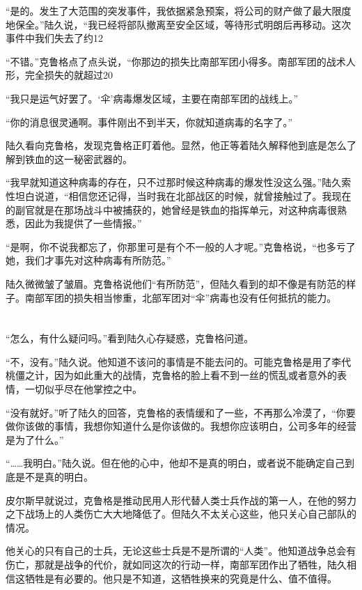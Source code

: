 “是的。发生了大范围的突发事件，我依据紧急预案，将公司的财产做了最大限度地保全。”陆久说，“我已经将部队撤离至安全区域，等待形式明朗后再移动。这次事件中我们失去了约12%

“不错。”克鲁格点了点头说，“你那边的损失比南部军团小得多。南部军团的战术人形，完全损失的就超过20%

“我只是运气好罢了。‘伞’病毒爆发区域，主要在南部军团的战线上。”

“你的消息很灵通啊。事件刚出不到半天，你就知道病毒的名字了。”

陆久看向克鲁格，发现克鲁格正盯着他。显然，他正等着陆久解释他到底是怎么了解到铁血的这一秘密武器的。

“我早就知道这种病毒的存在，只不过那时候这种病毒的爆发性没这么强。”陆久索性坦白说道，“相信您还记得，当时我在北部战区的时候，就曾接触过了。我现在的副官就是在那场战斗中被捕获的，她曾经是铁血的指挥单元，对这种病毒很熟悉，因此为我提供了一些情报。”

“是啊，你不说我都忘了，你那里可是有个不一般的人才呢。”克鲁格说，“也多亏了她，我们才事先对这种病毒有所防范。”

陆久微微皱了皱眉。克鲁格说他们“有所防范”，但陆久看到的却不像是有防范的样子。南部军团的损失相当惨重，北部军团对“伞”病毒也没有任何抵抗的能力。

\section*{}

“怎么，有什么疑问吗。”看到陆久心存疑惑，克鲁格问道。

“不，没有。”陆久说。他知道不该问的事情是不能去问的。可能克鲁格是用了李代桃僵之计，因为如此重大的战情，克鲁格的脸上看不到一丝的慌乱或者意外的表情，一切似乎尽在他掌控之中。

“没有就好。”听了陆久的回答，克鲁格的表情缓和了一些，不再那么冷漠了，“你要做你该做的事情，我想你知道什么是你该做的。我想你应该明白，公司多年的经营是为了什么。”

“……我明白。”陆久说。但在他的心中，他却不是真的明白，或者说不能确定自己到底是不是真的明白。

皮尔斯早就说过，克鲁格是推动民用人形代替人类士兵作战的第一人，在他的努力之下战场上的人类伤亡大大地降低了。但陆久不太关心这些，他只关心自己部队的情况。

他关心的只有自己的士兵，无论这些士兵是不是所谓的“人类”。他知道战争总会有伤亡，那就是战争的代价，就如同这次的行动一样，南部军团作出了牺牲，陆久相信这牺牲是有必要的。他只是不知道，这牺牲换来的究竟是什么、值不值得。

